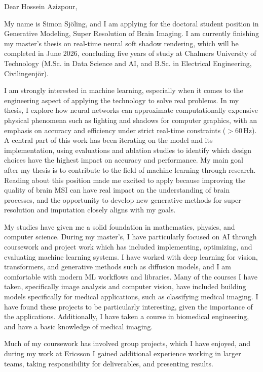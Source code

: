 \documentclass[A4,11pt]{letter}
\begin{document}
Dear Hossein Azizpour,

My name is Simon Sjöling, and I am applying for the doctoral student position in Generative Modeling, Super Resolution of Brain Imaging. I am currently finishing my master's thesis on real-time neural soft shadow rendering, which will be completed in June 2026, concluding five years of study at Chalmers University of Technology (M.Sc. in Data Science and AI, and B.Sc. in Electrical Engineering, Civilingenjör).

I am strongly interested in machine learning, especially when it comes to the engineering aspect of applying the technology to solve real problems. In my thesis, I explore how neural networks can approximate computationally expensive physical phenomena such as lighting and shadows for computer graphics, with an emphasis on accuracy and efficiency under strict real-time constraints ($> 60 \, \text{Hz}$).
A central part of this work has been iterating on the model and its implementation, using evaluations and ablation studies to identify which design choices have the highest impact on accuracy and performance. My main goal after my thesis is to contribute to the field of machine learning through research. Reading about this position made me excited to apply because improving the quality of brain MSI can have real impact on the understanding of brain processes, and the opportunity to develop new generative methods for super-resolution and imputation closely aligns with my goals.

My studies have given me a solid foundation in mathematics, physics, and computer science. During my master's, I have particularly focused on AI through coursework and project work which has included implementing, optimizing, and evaluating machine learning systems. I have worked with deep learning for vision, transformers, and generative methods such as diffusion models, and I am comfortable with modern ML workflows and libraries. Many of the courses I have taken, specifically image analysis and computer vision, have included building models specifically for medical applications, such as classifying medical imaging. I have found these projects to be particularly interesting, given the importance of the applications. Additionally, I have taken a course in biomedical engineering, and have a basic knowledge of medical imaging.

Much of my coursework has involved group projects, which I have enjoyed, and during my work at Ericsson I gained additional experience working in larger teams, taking responsibility for deliverables, and presenting results.
\end{document}
